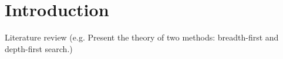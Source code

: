 \section{Introduction}
Literature review (e.g. Present the theory of two methods: breadth-first and depth-first search.)
